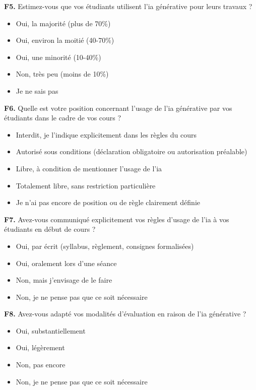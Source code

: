 \textbf{F5.} Estimez-vous que vos étudiants utilisent l'\gls{ia} générative pour leurs travaux ?
\begin{itemize}[label=$\square$, leftmargin=1.5cm]
  \item Oui, la majorité (plus de 70\%)
  \item Oui, environ la moitié (40-70\%)
  \item Oui, une minorité (10-40\%)
  \item Non, très peu (moins de 10\%)
  \item Je ne sais pas
\end{itemize}

\textbf{F6.} Quelle est votre position concernant l'usage de l'\gls{ia}
générative par vos étudiants dans le cadre de vos cours ?
\begin{itemize}[label=$\square$, leftmargin=1.5cm]
  \item Interdit, je l'indique explicitement dans les règles du cours
  \item Autorisé sous conditions (déclaration obligatoire ou autorisation
        préalable)
  \item Libre, à condition de mentionner l'usage de l'\gls{ia}
  \item Totalement libre, sans restriction particulière
  \item Je n'ai pas encore de position ou de règle clairement définie
\end{itemize}

\textbf{F7.} Avez-vous communiqué explicitement vos règles d'usage de
l'\gls{ia} à vos étudiants en début de cours ?
\begin{itemize}[label=$\square$, leftmargin=1.5cm]
  \item Oui, par écrit (syllabus, règlement, consignes formalisées)
  \item Oui, oralement lors d'une séance
  \item Non, mais j'envisage de le faire
  \item Non, je ne pense pas que ce soit nécessaire
\end{itemize}

\textbf{F8.} Avez-vous adapté vos modalités d'évaluation en raison de l'\gls{ia} générative ?
\begin{itemize}[label=$\square$, leftmargin=1.5cm]
  \item Oui, substantiellement
  \item Oui, légèrement
  \item Non, pas encore
  \item Non, je ne pense pas que ce soit nécessaire
\end{itemize}


